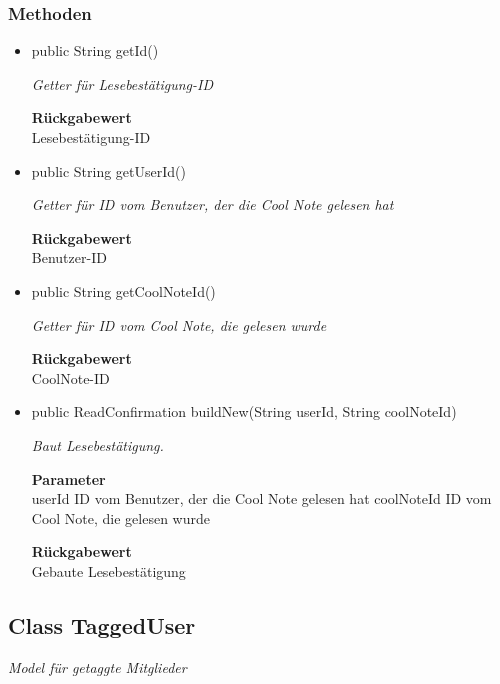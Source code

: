 \documentclass[a4paper]{scrreprt}
\begin{document}
        \subsubsection{Methoden}
        \begin{itemize}
        	\item{public String getId()}
        	
        	\textit{Getter für Lesebestätigung-ID}
        	
        	
        	
        	\textbf{Rückgabewert} \\
        	Lesebestätigung-ID        \item{public String getUserId()}
        	
        	\textit{Getter für ID vom Benutzer, der die Cool Note gelesen hat}
        	
        	
        	
        	\textbf{Rückgabewert} \\
        	Benutzer-ID        \item{public String getCoolNoteId()}
        	
        	\textit{Getter für ID vom Cool Note, die gelesen wurde}
        	
        	
        	
        	\textbf{Rückgabewert} \\
        	CoolNote-ID        \item{public ReadConfirmation buildNew(String userId, String coolNoteId)}
        	
        	\textit{Baut Lesebestätigung.}
        	
        	\textbf{Parameter} \\
        	userId ID vom Benutzer, der die Cool Note gelesen hat
        	coolNoteId ID vom Cool Note, die gelesen wurde
        	
        	\textbf{Rückgabewert} \\
        	Gebaute Lesebestätigung
        \end{itemize}
        \subsection{Class TaggedUser}
        \textit{Model für getaggte Mitglieder}
\end{document}
